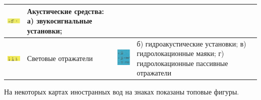 \documentclass[a4paper, 12pt, twoside, final, book, russian, fittopage, cyremdash]{ncc}
\begin{document}
\begin{longtable}{M|m{0.2\textwidth}|M|m{0.2\textwidth}}
  \includegraphics[scale=1.3]{APP-2-B-22} & Акустические средства: \newline а) звукосигнальные установки; \\
  \midrule
  \includegraphics[scale=1.3]{APP-2-B-17} & Световые отражатели &
  \includegraphics[scale=1.3]{APP-2-B-23} & б) гидроакустические установки; \newline в) гидролокационные маяки; \newline г) гидролокационные пассивные отражатели \\
  \bottomrule
\end{longtable}

На некоторых картах иностранных вод на знаках показаны топовые фигуры.
\end{document}
